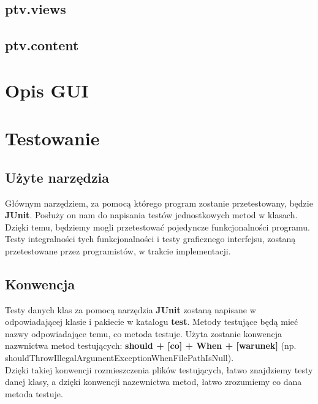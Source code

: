 \documentclass[]{article}
\begin{document}
        \subsection{ptv.views} %
        \subsection{ptv.content}

    
    \section{Opis GUI} %
    
    
    \section{Testowanie}
        \subsection{Użyte narzędzia}
        Głównym narzędziem, za pomocą którego program zostanie przetestowany, będzie \textbf{JUnit}.
        Posłuży on nam do napisania testów jednostkowych metod w klasach.
        Dzięki temu, będziemy mogli przetestować pojedyncze funkcjonalności programu.\\
        Testy integralności tych funkcjonalności i testy graficznego interfejsu, zostaną przetestowane przez programistów, w trakcie implementacji.
        
        \subsection{Konwencja}
        Testy danych klas za pomocą narzędzia \textbf{JUnit} zostaną napisane w odpowiadającej klasie i pakiecie
        w katalogu \textbf{test}.
        Metody testujące będą mieć nazwy odpowiadające temu, co metoda testuje.
        Użyta zostanie konwencja nazwnictwa metod testujących: \textbf{should + [co] + When + [warunek]}
        (np. shouldThrowIllegalArgumentExceptionWhenFilePathIsNull).\\
        Dzięki takiej konwencji rozmieszczenia plików testujących, łatwo znajdziemy testy danej klasy,
        a dzięki konwencji nazewnictwa metod, łatwo zrozumiemy co dana metoda testuje.
        
\end{document}
